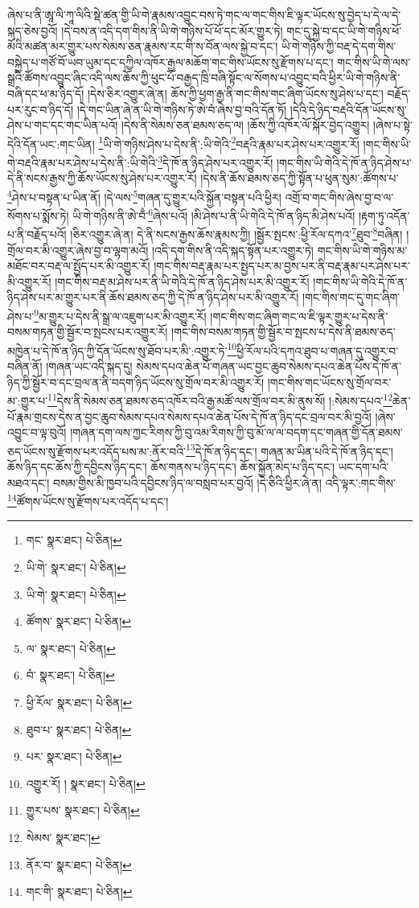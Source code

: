 ཞེས་པ་ནི་ཨཱ་ལི་ཀཱ་ལིའི་སྡེ་ཚན་གྱི་ཡི་གེ་རྣམས་འབྱུང་བས་ཏེ་གང་ལ་གང་གིས་ཇི་ལྟར་ཡོངས་སུ་བྱེད་པ་དེ་ལ་དེ་སྐད་ཅེས་བྱའོ། །དེ་བས་ན་འདི་དག་གིས་ནི་ཡི་གེ་གཉིས་པོ་ཕོ་དང་མོར་གྱུར་ཏེ། གང་དུ་སྐྱེ་བ་དང་ཡི་གེ་གཉིས་ཕོ་མོའི་མཚན་མར་གྱུར་པས་སེམས་ཅན་རྣམས་རང་གི་ས་བོན་ལས་སྐྱེ་བ་དང་། ཡི་གེ་གཉིས་ཀྱི་བརྡ་དེ་དག་གིས་བསྐྱེད་པ་གཙོ་བོ་ཡབ་ཡུམ་དང་དཀྱིལ་འཁོར་རྒྱལ་མཆོག་གང་གིས་ཡོངས་སུ་རྫོགས་པ་དང་། གང་གིས་ཡི་གེ་ལས་སྒྲའི་ཚོགས་འབྱུང་ཞིང་འདི་ལས་ཆོས་ཀྱི་ཕུང་པོ་བརྒྱད་ཁྲི་བཞི་སྟོང་ལ་སོགས་པ་འབྱུང་བའི་ཕྱིར་ཡི་གེ་གཉིས་ནི་བཞི་དང་ཕ་མ་ཉིད་དོ། །དེས་ཅིར་འགྱུར་ཞེ་ན། ཆོས་ཀྱི་ཕྱག་རྒྱ་ནི་གང་གིས་གང་ཞིག་ཡོངས་སུ་ཤེས་པ་དང་། བརྗོད་པར་རུང་བ་ཉིད་དོ། །དེ་གང་ཡིན་ཞེ་ན་ཡི་གེ་གཉིས་ཏེ་ཨེ་བཾ་ཞེས་བྱ་བའི་དོན་ཏོ། །དེའི་དེ་ཉིད་བརྡའི་དོན་ཡོངས་སུ་ཤེས་པ་གང་དང་གང་ཡིན་པའོ། །དེས་ནི་སེམས་ཅན་ཐམས་ཅད་ལ། །ཆོས་ཀྱི་འཁོར་ལོ་སྐོར་བྱེད་འགྱུར། །ཞེས་པ་སྟེ་དེའི་དོན་ཡང་:གང་ཡིན། \footnote{གང་  སྣར་ཐང་།  པེ་ཅིན། }ཡི་གེ་གཉིས་ཤེས་པ་དེས་ནི་:ཡི་གེའི་\footnote{ཡི་གེ་  སྣར་ཐང་།  པེ་ཅིན། }བརྡའི་རྣམ་པར་ཤེས་པར་འགྱུར་རོ། །གང་གིས་ཡི་གེ་བརྡའི་རྣམ་པར་ཤེས་པ་དེས་ནི་:ཡི་གེའི་\footnote{ཡི་གེ་  སྣར་ཐང་།  པེ་ཅིན། }དེ་ཁོ་ན་ཉིད་ཤེས་པར་འགྱུར་རོ། །གང་གིས་ཡི་གེའི་དེ་ཁོ་ན་ཉིད་ཤེས་པ་དེ་ནི་སངས་རྒྱས་ཀྱི་ཆོས་ཡོངས་སུ་ཤེས་པར་འགྱུར་རོ། །དེས་ནི་ཆོས་ཐམས་ཅད་ཀྱི་སྟོན་པ་ཕུན་སུམ་:ཚོགས་པ་\footnote{ཚོགས་  སྣར་ཐང་།  པེ་ཅིན། }ཤེས་པ་བསྟན་པ་ཡིན་ནོ། །དེ་ལས་\footnote{ལ་  སྣར་ཐང་།  པེ་ཅིན། }གཞན་དུ་གྱུར་པའི་སྐྱོན་བསྟན་པའི་ཕྱིར། འགྲོ་བ་གང་གིས་ཞེས་བྱ་བ་ལ་སོགས་པ་སྨོས་ཏེ། ཡི་གེ་གཉིས་ནི་ཨེ་བྃ་\footnote{བཾ་  སྣར་ཐང་།  པེ་ཅིན། }ཞེས་པའོ། །མི་ཤེས་པ་ནི་ཡི་གེའི་དེ་ཁོ་ན་ཉིད་མི་ཤེས་པའོ། །རྟག་ཏུ་འདོན་པ་ནི་བརྗོད་པའོ། །ཅིར་འགྱུར་ཞེ་ན། དེ་ནི་སངས་རྒྱས་ཆོས་རྣམས་ཀྱི། །སྦྱོར་སྤངས་:ཕྱི་རོལ་དཀའ་\footnote{ཕྱི་རོལ་  སྣར་ཐང་།  པེ་ཅིན། }ཐུབ་\footnote{ཐུབ་པ་  སྣར་ཐང་།  པེ་ཅིན། }བཞིན། །གྲོལ་བར་མི་འགྱུར་ཞེས་བྱ་བ་ལྷག་མའོ། །འདི་དག་གིས་ནི་འདི་སྐད་སྟོན་པར་འགྱུར་ཏེ། གང་གིས་ཡི་གེ་གཉིས་མ་མཐོང་བར་བརྡ་ལ་སྤྱོད་པར་མི་འགྱུར་རོ། །གང་གིས་བརྡ་རྣམ་པར་སྤྱད་པར་མ་བྱས་པར་ནི་བརྡ་རྣམ་པར་ཤེས་པར་མི་འགྱུར་རོ། །གང་གིས་བརྡ་མ་ཤེས་པར་ནི་ཡི་གེའི་དེ་ཁོ་ན་ཉིད་ཤེས་པར་མི་འགྱུར་རོ། །གང་གིས་ཡི་གེའི་དེ་ཁོ་ན་ཉིད་ཤེས་པར་མ་གྱུར་པར་ནི་ཆོས་ཐམས་ཅད་ཀྱི་དེ་ཁོ་ན་ཉིད་ཤེས་པར་མི་འགྱུར་རོ། །གང་གིས་གང་དུ་གང་ཞིག་ཤེས་པ་\footnote{པར་  སྣར་ཐང་།  པེ་ཅིན། }མ་གྱུར་པ་དེས་ནི་སྒྲ་ལ་འཇུག་པར་མི་འགྱུར་རོ། །གང་གིས་གང་ཞིག་གང་ལ་ཇི་ལྟར་གྱུར་པ་དེས་ནི་བསམ་གཏན་གྱི་སྦྱོར་བ་སྤངས་པར་འགྱུར་རོ། །གང་གིས་བསམ་གཏན་གྱི་སྦྱོར་བ་སྤངས་པ་དེས་ནི་ཐམས་ཅད་མཁྱེན་པ་དེ་ཁོ་ན་ཉིད་ཀྱི་དོན་ཡོངས་སུ་ཐོབ་པར་མི་:འགྱུར་ཏེ་\footnote{འགྱུར་རོ། །  སྣར་ཐང་།  པེ་ཅིན། }ཕྱི་རོལ་པའི་དཀའ་ཐུབ་པ་གཞན་དུ་འགྱུར་བ་བཞིན་ནོ། །གཞན་ཡང་འདི་སྐད་དུ། སེམས་དཔའ་ཆེན་པོ་གཞན་ཡང་བྱང་ཆུབ་སེམས་དཔའ་ཆེན་པོས་དེ་ཁོ་ན་ཉིད་ཀྱི་སྦྱོར་བ་དང་བྲལ་ན་ནི་བདག་ཉིད་ཡོངས་སུ་གྲོལ་བར་མི་འགྱུར་རོ། །གང་གིས་གང་ཡོངས་སུ་གྲོལ་བར་མ་:གྱུར་པ་\footnote{གྱུར་པས་  སྣར་ཐང་།  པེ་ཅིན། }དེས་ནི་སེམས་ཅན་ཐམས་ཅད་འཁོར་བའི་རྒྱ་མཚོ་ལས་གྲོལ་བར་མི་ནུས་སོ། །:སེམས་དཔའ་\footnote{སེམས་  སྣར་ཐང་། }ཆེན་པོ་རྣམ་གྲངས་དེས་ན་བྱང་ཆུབ་སེམས་དཔའ་སེམས་དཔའ་ཆེན་པོས་དེ་ཁོ་ན་ཉིད་དང་བྲལ་བར་མི་བྱའོ། །ཞེས་འབྱུང་བ་ལྟ་བུའོ། །གཞན་དག་ལས་ཀྱང་རིགས་ཀྱི་བུ་འམ་རིགས་ཀྱི་བུ་མོ་ལ་ལ་བདག་དང་གཞན་གྱི་དོན་ཐམས་ཅད་ཡོངས་སུ་རྫོགས་པར་འདོད་པས་མ་:ནོར་བའི་\footnote{ནོར་བ་  སྣར་ཐང་།  པེ་ཅིན། }དེ་ཁོ་ན་ཉིད་དང་། གཞན་མ་ཡིན་པའི་དེ་ཁོ་ན་ཉིད་དང་། ཆོས་ཉིད་དང་ཆོས་ཀྱི་དབྱིངས་ཉིད་དང་། ཆོས་གནས་པ་ཉིད་དང་། ཆོས་སྐྱོན་མེད་པ་ཉིད་དང་། ཡང་དག་པའི་མཐའ་དང་། བསམ་གྱིས་མི་ཁྱབ་པའི་དབྱིངས་ཉིད་ལ་བསླབ་པར་བྱའོ། །དེ་ཅིའི་ཕྱིར་ཞེ་ན། འདི་ལྟར་:གང་གིས་\footnote{གང་གི་  སྣར་ཐང་།  པེ་ཅིན། }ཚོགས་ཡོངས་སུ་རྫོགས་པར་འདོད་པ་དང་། 